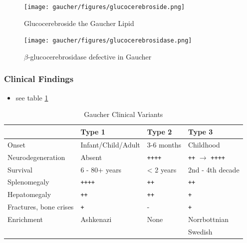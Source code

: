 \documentclass[12pt]{scrartcl}
\begin{document}
\begin{figure}[htbp]
\centering
\texttt{[image: gaucher/figures/glucocerebroside.png]}
\caption{\label{fig:org992fbb0}Glucocerebroside the Gaucher Lipid}
\end{figure}

\begin{figure}[htbp]
\centering
\texttt{[image: gaucher/figures/glucocerebrosidase.png]}
\caption{\label{fig:org67beb9c}\(\beta\)-glucocerebrosidase defective in Gaucher}
\end{figure}


\subsubsection{Clinical Findings}
\label{sec:org4113e5b}
\begin{itemize}
\item see table \ref{tab:orgd927259}
\end{itemize}

\begin{table}[htbp]
\caption{\label{tab:orgd927259}Gaucher Clinical Variants}
\centering
\begin{tabular}{llll}
 & Type 1 & Type 2 & Type 3\\
\hline
Onset & Infant/Child/Adult & 3-6 months & Childhood\\
Neurodegeneration & Absent & \texttt{++++} & \texttt{++} \(\to\) \texttt{++++}\\
Survival & 6 - 80+ years & < 2 years & 2nd - 4th decade\\
Splenomegaly & \texttt{++++} & \texttt{++} & \texttt{++}\\
Hepatomegaly & \texttt{++} & \texttt{++} & \texttt{+}\\
Fractures, bone crises & \texttt{+} & - & \texttt{+}\\
Enrichment & Ashkenazi & None & Norrbottnian\\
 &  &  & Swedish\\
\end{tabular}
\end{table}
\end{document}
